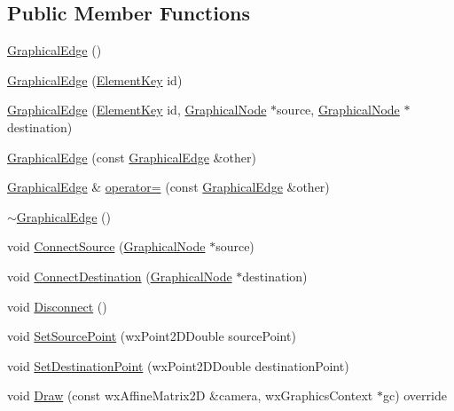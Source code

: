 \subsection*{Public Member Functions}
\begin{DoxyCompactItemize}
\item 
\hyperlink{class_graphical_edge_a9325712366dcec2f70457f66b19bb04d}{Graphical\+Edge} ()
\item 
\hyperlink{class_graphical_edge_a5031d58d1096dbeef7f1c1c2e0cdb1f6}{Graphical\+Edge} (\hyperlink{_graphical_element_8h_ade5fd6c85839a416577ff9de1605141e}{Element\+Key} id)
\item 
\hyperlink{class_graphical_edge_af8c31162129b7c33427de769beaed38d}{Graphical\+Edge} (\hyperlink{_graphical_element_8h_ade5fd6c85839a416577ff9de1605141e}{Element\+Key} id, \hyperlink{class_graphical_node}{Graphical\+Node} $\ast$source, \hyperlink{class_graphical_node}{Graphical\+Node} $\ast$destination)
\item 
\hyperlink{class_graphical_edge_a50ac3c64f7c8d259d5905802a1808aa6}{Graphical\+Edge} (const \hyperlink{class_graphical_edge}{Graphical\+Edge} \&other)
\item 
\hyperlink{class_graphical_edge}{Graphical\+Edge} \& \hyperlink{class_graphical_edge_ad590b20ea1c1cb30a15850a36f82a2c9}{operator=} (const \hyperlink{class_graphical_edge}{Graphical\+Edge} \&other)
\item 
\hyperlink{class_graphical_edge_ac19b4561ff4274f8fbbc6700a86b2f27}{$\sim$\+Graphical\+Edge} ()
\item 
void \hyperlink{class_graphical_edge_a9f2e7f370705c390ad67f5b18ed80a00}{Connect\+Source} (\hyperlink{class_graphical_node}{Graphical\+Node} $\ast$source)
\item 
void \hyperlink{class_graphical_edge_a41868fd50c413744e61a549f1cef6a79}{Connect\+Destination} (\hyperlink{class_graphical_node}{Graphical\+Node} $\ast$destination)
\item 
void \hyperlink{class_graphical_edge_acc50ad4ea639802ce7d700d17f28f0e3}{Disconnect} ()
\item 
void \hyperlink{class_graphical_edge_a02acb6e42ac2d6def8a662006db2b1ff}{Set\+Source\+Point} (wx\+Point2\+D\+Double source\+Point)
\item 
void \hyperlink{class_graphical_edge_af6eedeeadcd9abc368b1c0725617f5c9}{Set\+Destination\+Point} (wx\+Point2\+D\+Double destination\+Point)
\item 
void \hyperlink{class_graphical_edge_a48170a7fc9e86d92985d694addca8837}{Draw} (const wx\+Affine\+Matrix2D \&camera, wx\+Graphics\+Context $\ast$gc) override

\end{DoxyCompactItemize}
